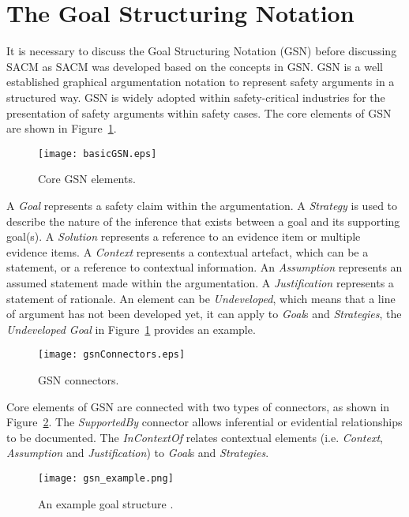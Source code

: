\section{The Goal Structuring Notation}
\label{sec:gsn}
It is necessary to discuss the Goal Structuring Notation (GSN) before discussing SACM as SACM was developed based on the concepts in GSN. 
GSN is a well established graphical argumentation notation to represent safety arguments in a structured way. 
GSN is widely adopted within safety-critical industries for the presentation of safety arguments within safety cases. 
The core elements of GSN are shown in Figure~\ref{fig:gsnCore}.

\begin{figure}
	\centering
	\texttt{[image: basicGSN.eps]}
	\caption{Core GSN elements.}
	\label{fig:gsnCore}
\end{figure}


A \textit{Goal} represents a safety claim within the argumentation. 
A \textit{Strategy} is used to describe the nature of the inference that exists between a goal and its supporting goal(s). 
A \textit{Solution} represents a reference to an evidence item or multiple evidence items. 
A \textit{Context} represents a contextual artefact, which can be a statement, or a reference to contextual information. 
An \textit{Assumption} represents an assumed statement made within the argumentation. 
A \textit{Justification} represents a statement of rationale. 
An element can be \textit{Undeveloped}, which means that a line of argument has not been developed yet, it can apply to \textit{Goal}s and \textit{Strategies}, the \textit{Undeveloped Goal} in Figure~\ref{fig:gsnCore} provides an example. 

\begin{figure}
	\centering
	\texttt{[image: gsnConnectors.eps]}
	\caption{GSN connectors.}
	\label{fig:gsnEdges}
\end{figure}

Core elements of GSN are connected with two types of connectors, as shown in Figure~\ref{fig:gsnEdges}. 
The \textit{SupportedBy} connector allows inferential or evidential relationships to be documented. 
The \textit{InContextOf} relates contextual elements (i.e. \textit{Context}, \textit{Assumption} and \textit{Justification}) to \textit{Goal}s and \textit{Strategies}.
\begin{figure}
	\centering
	\texttt{[image: gsn\_example.png]}
	\caption{An example goal structure \cite{gsn2010draft}.}
	\label{fig:goalStructure}
\end{figure}

